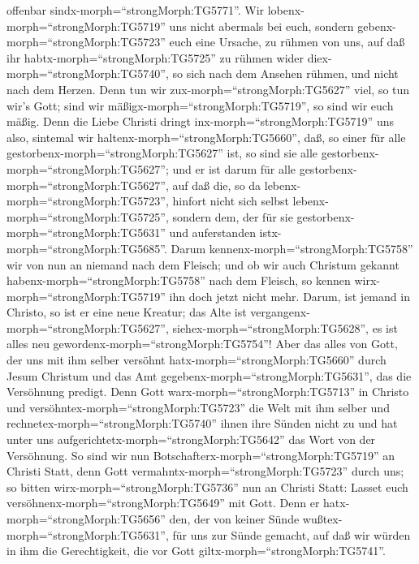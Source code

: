 offenbar sindx-morph=``strongMorph:TG5771''.  Wir
lobenx-morph=``strongMorph:TG5719'' uns nicht abermals bei euch, sondern
gebenx-morph=``strongMorph:TG5723'' euch eine Ursache, zu rühmen von
uns, auf daß ihr habtx-morph=``strongMorph:TG5725'' zu rühmen wider
diex-morph=``strongMorph:TG5740'', so sich nach dem Ansehen rühmen, und
nicht nach dem Herzen.  Denn tun wir
zux-morph=``strongMorph:TG5627'' viel, so tun wir's Gott; sind wir
mäßigx-morph=``strongMorph:TG5719'', so sind wir euch mäßig.
 Denn die Liebe Christi dringt
inx-morph=``strongMorph:TG5719'' uns also, sintemal wir
haltenx-morph=``strongMorph:TG5660'', daß, so einer für alle
gestorbenx-morph=``strongMorph:TG5627'' ist, so sind sie alle
gestorbenx-morph=``strongMorph:TG5627'';  und er ist darum
für alle gestorbenx-morph=``strongMorph:TG5627'', auf daß die, so da
lebenx-morph=``strongMorph:TG5723'', hinfort nicht sich selbst
lebenx-morph=``strongMorph:TG5725'', sondern dem, der für sie
gestorbenx-morph=``strongMorph:TG5631'' und auferstanden
istx-morph=``strongMorph:TG5685''.  Darum
kennenx-morph=``strongMorph:TG5758'' wir von nun an niemand nach dem
Fleisch; und ob wir auch Christum gekannt
habenx-morph=``strongMorph:TG5758'' nach dem Fleisch, so kennen
wirx-morph=``strongMorph:TG5719'' ihn doch jetzt nicht mehr.
 Darum, ist jemand in Christo, so ist er eine neue Kreatur;
das Alte ist vergangenx-morph=``strongMorph:TG5627'',
siehex-morph=``strongMorph:TG5628'', es ist alles neu
gewordenx-morph=``strongMorph:TG5754''!  Aber das alles von
Gott, der uns mit ihm selber versöhnt hatx-morph=``strongMorph:TG5660''
durch Jesum Christum und das Amt gegebenx-morph=``strongMorph:TG5631'',
das die Versöhnung predigt.  Denn Gott
warx-morph=``strongMorph:TG5713'' in Christo und
versöhntex-morph=``strongMorph:TG5723'' die Welt mit ihm selber und
rechnetex-morph=``strongMorph:TG5740'' ihnen ihre Sünden nicht zu und
hat unter uns aufgerichtetx-morph=``strongMorph:TG5642'' das Wort von
der Versöhnung.  So sind wir nun
Botschafterx-morph=``strongMorph:TG5719'' an Christi Statt, denn Gott
vermahntx-morph=``strongMorph:TG5723'' durch uns; so bitten
wirx-morph=``strongMorph:TG5736'' nun an Christi Statt: Lasset euch
versöhnenx-morph=``strongMorph:TG5649'' mit Gott.  Denn er
hatx-morph=``strongMorph:TG5656'' den, der von keiner Sünde
wußtex-morph=``strongMorph:TG5631'', für uns zur Sünde gemacht, auf daß
wir würden in ihm die Gerechtigkeit, die vor Gott
giltx-morph=``strongMorph:TG5741''.

